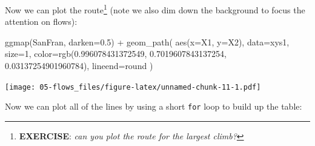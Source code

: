 \documentclass[
]{book}
\newenvironment{Shaded}{\begin{snugshade}}{\end{snugshade}}
\newcommand{\AttributeTok}[1]{\textcolor[rgb]{0.77,0.63,0.00}{#1}}
\newcommand{\CommentTok}[1]{\textcolor[rgb]{0.56,0.35,0.01}{\textit{#1}}}
\newcommand{\ControlFlowTok}[1]{\textcolor[rgb]{0.13,0.29,0.53}{\textbf{#1}}}
\newcommand{\DecValTok}[1]{\textcolor[rgb]{0.00,0.00,0.81}{#1}}
\newcommand{\FloatTok}[1]{\textcolor[rgb]{0.00,0.00,0.81}{#1}}
\newcommand{\FunctionTok}[1]{\textcolor[rgb]{0.00,0.00,0.00}{#1}}
\newcommand{\NormalTok}[1]{#1}
\newcommand{\OtherTok}[1]{\textcolor[rgb]{0.56,0.35,0.01}{#1}}
\newcommand{\SpecialCharTok}[1]{\textcolor[rgb]{0.00,0.00,0.00}{#1}}
\newcommand{\StringTok}[1]{\textcolor[rgb]{0.31,0.60,0.02}{#1}}
\begin{document}
Now we can plot the route\footnote{\textbf{EXERCISE}: \emph{can you plot the route for the largest climb?}} (note we also dim down the background to focus the attention on flows):

\begin{Shaded}
\begin{Highlighting}[]
\FunctionTok{ggmap}\NormalTok{(SanFran, }\AttributeTok{darken=}\FloatTok{0.5}\NormalTok{) }\SpecialCharTok{+} 
  \FunctionTok{geom\_path}\NormalTok{(}
    \FunctionTok{aes}\NormalTok{(}\AttributeTok{x=}\NormalTok{X1, }\AttributeTok{y=}\NormalTok{X2), }
    \AttributeTok{data=}\NormalTok{xys1,}
    \AttributeTok{size=}\DecValTok{1}\NormalTok{,}
    \AttributeTok{color=}\FunctionTok{rgb}\NormalTok{(}\FloatTok{0.996078431372549}\NormalTok{, }\FloatTok{0.7019607843137254}\NormalTok{, }\FloatTok{0.03137254901960784}\NormalTok{),}
    \AttributeTok{lineend=}\StringTok{\textquotesingle{}round\textquotesingle{}}
\NormalTok{    )}
\end{Highlighting}
\end{Shaded}

\texttt{[image: 05-flows\_files/figure-latex/unnamed-chunk-11-1.pdf]}

Now we can plot all of the lines by using a short \texttt{for} loop to build up the table:

\begin{Shaded}
\end{Shaded}
\end{document}
